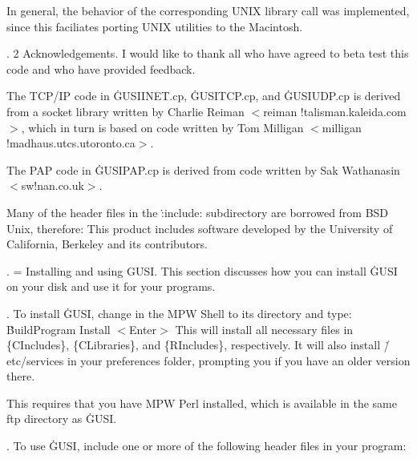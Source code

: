 \medskip{}

\medskip
In general, the behavior of the corresponding UNIX library call was
implemented,
since this faciliates porting UNIX utilities to the Macintosh.

\fi

. 2 Acknowledgements. I would like to thank all who have agreed to beta test
this
code and who have provided feedback.

\medskip The TCP/IP code in \.{GUSIINET.cp}, \.{GUSITCP.cp}, and \.{GUSIUDP.cp}
is
derived from a socket library written by Charlie Reiman $<$reiman%
\AT!talisman.kaleida.com$>$,
which in turn is based on code written by Tom Milligan $<$milligan%
\AT!madhaus.utcs.utoronto.ca$>$.

\medskip The PAP code in \.{GUSIPAP.cp} is derived from code written by Sak
Wathanasin
$<$sw\AT!nan.co.uk$>$.

\medskip Many of the header files in the \.{:include:} subdirectory are
borrowed from BSD Unix,
therefore: This product includes software developed by the University of
California,
Berkeley and its contributors.

\fi

. = Installing and using GUSI. This section discusses how you can install
\.{GUSI} on your disk and use it for your programs.

\fi

. To install \.{GUSI}, change in the MPW Shell to its directory and type:
\medskip
\.{BuildProgram Install $<$Enter$>$}
\medskip
This will install all necessary files in \.{\{CIncludes\}}, \.{\{CLibraries\}},
and
\.{\{RIncludes\}}, respectively. It will also install \.{/etc/services} in your
preferences
folder, prompting you if you have an older version there.

\medskip
This requires that you have MPW Perl installed, which is available in the same
ftp
directory as \.{GUSI}.

\fi

. To use \.{GUSI}, include one or more of the following header files in your
program:
\medskip{}

